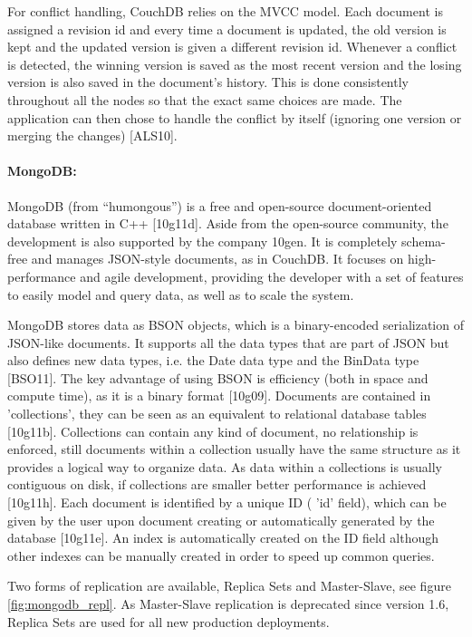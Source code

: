 \pagebreak
\pagebreak
For conflict handling, CouchDB relies on the MVCC model. Each document is assigned a revision id and every time a document is updated, the old version is kept and the updated version is given a different revision id. Whenever a conflict is detected, the winning version is saved as the most recent version and the losing version is also saved in the document’s history. This is done consistently throughout all the nodes so that the exact same choices are made. The application can then chose to handle the conflict by itself (ignoring one version or merging the changes) [ALS10].


\paragraph{MongoDB:}
MongoDB (from “humongous”) is a free and open-source document-oriented database written in C++ [10g11d]. Aside from the open-source community, the development is also supported by the company 10gen.
It is completely schema-free and manages JSON-style documents, as in CouchDB. It focuses on high-performance and agile development, providing the developer with a set of features to easily model and query data, as well as to scale the system.

MongoDB stores data as BSON objects, which is a binary-encoded serialization of JSON-like documents. It supports all the data types that are part of JSON but also defines new data types, i.e. the Date data type and the BinData type [BSO11]. The key advantage of using BSON is efficiency (both in space and compute time), as it is a binary format [10g09].
Documents are contained in 'collections', they can be seen as an equivalent to relational database tables [10g11b]. Collections can contain any kind of document, no relationship is enforced, still documents within a collection usually have the same structure as it provides a logical way to organize data.
As data within a collections is usually contiguous on disk, if collections are smaller better performance is achieved [10g11h]. Each document is identified by a unique ID ( 'id' field), which can be given by the user upon document creating or automatically generated by the database [10g11e]. An index is automatically created on the ID field although other indexes can be manually created in order to speed up common queries.

Two forms of replication are available, Replica Sets and Master-Slave, see figure \ref{fig:mongodb_repl}. As Master-Slave replication is deprecated since version 1.6, Replica Sets are used for all new production deployments.

